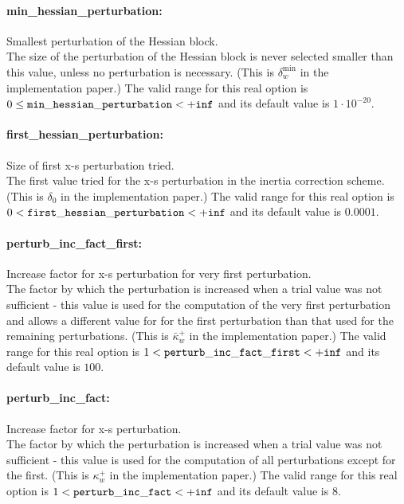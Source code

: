 \paragraph{min\_hessian\_perturbation:} Smallest perturbation of the Hessian block. $\;$ \\
 The size of the perturbation of the Hessian block
is never selected smaller than this value, unless
no perturbation is necessary. (This is
$\delta_w^{\min}$ in the implementation paper.) The valid range for this real option is 
$0 \le {\tt min\_hessian\_perturbation } <  {\tt +inf}$
and its default value is $1 \cdot 10^{-20}$.


\paragraph{first\_hessian\_perturbation:} Size of first x-s perturbation tried. $\;$ \\
 The first value tried for the x-s perturbation in
the inertia correction scheme.(This is $\delta_0$
in the implementation paper.) The valid range for this real option is 
$0 <  {\tt first\_hessian\_perturbation } <  {\tt +inf}$
and its default value is $0.0001$.


\paragraph{perturb\_inc\_fact\_first:} Increase factor for x-s perturbation for very first perturbation. $\;$ \\
 The factor by which the perturbation is increased
when a trial value was not sufficient - this
value is used for the computation of the very
first perturbation and allows a different value
for for the first perturbation than that used for
the remaining perturbations. (This is
$\bar\kappa_w^+$ in the implementation paper.) The valid range for this real option is 
$1 <  {\tt perturb\_inc\_fact\_first } <  {\tt +inf}$
and its default value is $100$.


\paragraph{perturb\_inc\_fact:} Increase factor for x-s perturbation. $\;$ \\
 The factor by which the perturbation is increased
when a trial value was not sufficient - this
value is used for the computation of all
perturbations except for the first. (This is
$\kappa_w^+$ in the implementation paper.) The valid range for this real option is 
$1 <  {\tt perturb\_inc\_fact } <  {\tt +inf}$
and its default value is $8$.


